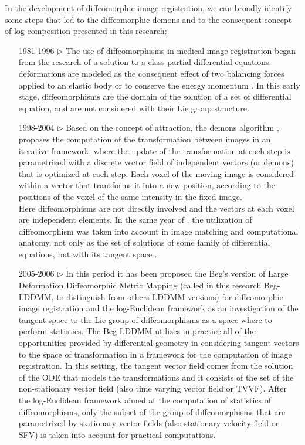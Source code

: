 In the development of diffeomorphic image registration, we can broadly identify some steps that led to the diffeomorphic demons and to the consequent concept of log-composition presented in this research:
\begin{enumerate}
	\item[1981-1996 $\triangleright$] The use of diffeomorphisms in medical image registration began from the research of a solution to a class partial differential equations: deformations are modeled as the consequent effect of two balancing forces applied to an elastic body \cite{Broit:1981} or to conserve the energy momentum \cite{christensen1996deformable}. In this early stage, diffeomorphisms are the domain of the solution of a set of differential equation, and are not considered with their Lie group structure.
	\item[1998-2004 $\triangleright$] Based on the concept of attraction, the demons algorithm \cite{thirion1998image}, \cite{pennec1999understanding} proposes the computation of the transformation between images in an iterative framework, where the update of the transformation at each step is parametrized with a discrete vector field of independent vectors (or demons) that is optimized at each step. Each voxel of the moving image is considered within a vector that transforms it into a new position, according to the positions of the voxel of the same intensity in the fixed image. \\
	Here diffeomorphisms are not directly involved and the vectors at each voxel are independent elements. 
	In the same year of \cite{thirion1998image}, the utilization of diffeomorphism was taken into account in image matching and computational anatomy, not only as the set of solutions of some family of differential equations, but with its tangent space \cite{Dupuis:98:variationalproblems,  trouve1998diffeomorphisms, grenander1998computational}.
	\item[2005-2006 $\triangleright$] In this period it has been proposed the Beg's version of Large Deformation Diffeomorphic Metric Mapping (called in this research Beg-LDDMM, to distinguish from others LDDMM versions) \cite{beg2005computing} for diffeomorphic image registration and the log-Euclidean framework \cite{arsigny2006statistics, Arsigny:MRM:06}  as an investigation of the tangent space to the Lie group of diffeomorphisms as a space where to perform statistics.
	The Beg-LDDMM utilizes in practice all of the opportunities provided by differential geometry in considering tangent vectors to the space of transformation in a framework for the computation of image registration. In this setting, the tangent vector field comes from the solution of the ODE that models the transformations and it consists of the set of the non-stationary vector field (also time varying vector field or TVVF). After the log-Euclidean framework aimed at the computation of statistics of diffeomorphisms, only the subset of the group of diffeomorphisms that are parametrized by stationary vector fields (also stationary velocity field or SFV) is taken into account for practical computations.

\end{enumerate}
